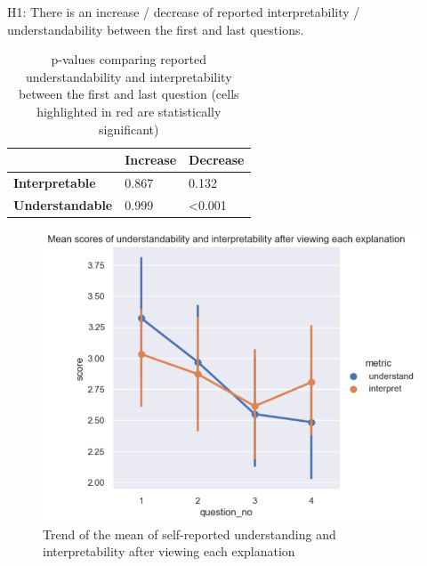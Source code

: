 \noindent H1: There is an increase / decrease of reported interpretability / understandability between the first and last questions.

\begin{table}[!ht]
  \centering
  \begin{tabular}{l|l|l|}
  \cline{2-3}
                                                & \textbf{Increase} & \textbf{Decrease} \\ \hline
  \multicolumn{1}{|l|}{\textbf{Interpretable}} & 0.867             & 0.132             \\ \hline
  \multicolumn{1}{|l|}{\textbf{Understandable}}  & 0.999             & \cellcolor{red!25}\textless{}0.001  \\ \hline
  \end{tabular}
  \caption{p-values comparing reported understandability and interpretability between the first and last question (cells highlighted in red are statistically significant)}
  \label{tab:p_values_interpret_understand}
\end{table}

\begin{figure}[!ht]
  \centering
  \includegraphics[width=1\linewidth]{figures/part3.png}
  \caption{Trend of the mean of self-reported understanding and interpretability after viewing each explanation}
  \label{fig:part3_trend}
\end{figure}

